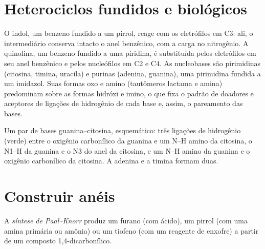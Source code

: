 \section{Heterociclos fundidos e biológicos}

O indol, um benzeno fundido a um pirrol, reage com os eletrófilos em C3: ali, o
intermediário conserva intacto o anel benzênico, com a carga no nitrogênio.
A quinolina, um benzeno fundido a uma piridina, é substituída pelos eletrófilos em
seu anel benzênico e pelos nucleófilos em C2 e C4. As nucleobases são
pirimidinas (citosina, timina, uracila) e purinas (adenina, guanina), uma
pirimidina fundida a um imidazol. Suas formas oxo e amino (tautômeros lactama e
amina) predominam sobre as formas hidróxi e imino, o que fixa o padrão de
doadores e aceptores de ligações de hidrogênio de cada base e, assim, o pareamento das bases.

\begin{omfigure}

{\small Um par de bases guanina--citosina, esquemático: três ligações de hidrogênio (verde)
entre o oxigênio carbonílico da guanina e um N--H amino da citosina, o N1--H da
guanina e o N3 do anel da citosina, e um N--H amino da guanina e o
oxigênio carbonílico da citosina. A adenina e a timina formam duas.}
\end{omfigure}

\section{Construir anéis}

\begin{definition}\label{def:b3:heterocycles:paal-knorr}
A \emph{síntese de Paal--Knorr} produz um furano
(com ácido), um pirrol (com uma amina primária ou amônia) ou um tiofeno (com um
reagente de enxofre) a partir de um composto 1,4-dicarbonílico.
\end{definition}

